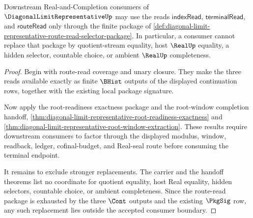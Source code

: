 \begin{theorem}
\label{thm:diagonal-limit-representative-route-read-consumer-boundary}
Downstream Real-and-Completion consumers of $\DiagonalLimitRepresentativeUp$ may use the reads $\mathsf{indexRead}$, $\mathsf{terminalRead}$, and $\mathsf{routeRead}$ only through the finite package of \autoref{def:diagonal-limit-representative-route-read-selector-package}. In particular, a consumer cannot replace that package by quotient-stream equality, host $\RealUp$ equality, a hidden selector, countable choice, or ambient $\RealUp$ completeness.
\end{theorem}
\begin{proof}
Begin with route-read coverage and unary closure. They make the three reads available exactly as finite $\BHist$ outputs of the displayed continuation rows, together with the existing local package signature.

Now apply the root-readiness exactness package and the root-window completion handoff, \autoref{thm:diagonal-limit-representative-root-readiness-exactness} and \autoref{thm:diagonal-limit-representative-root-window-extraction}. These results require downstream consumers to factor through the displayed modulus, window, readback, ledger, cofinal-budget, and Real-seal route before consuming the terminal endpoint.

It remains to exclude stronger replacements. The carrier and the handoff theorems list no coordinate for quotient equality, host Real equality, hidden selectors, countable choice, or ambient completeness. Since the route-read package is exhausted by the three $\Cont$ outputs and the existing $\PkgSig$ row, any such replacement lies outside the accepted consumer boundary.
\end{proof}
